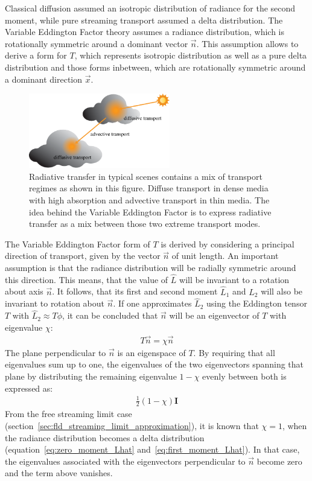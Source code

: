 Classical diffusion assumed an isotropic distribution of radiance for the second moment, while pure streaming transport assumed a delta distribution. The Variable Eddington Factor theory assumes a radiance distribution, which is rotationally symmetric around a dominant vector $\vec{n}$. This assumption allows to derive a form for $T$, which represents isotropic distribution as well as a pure delta distribution and those forms inbetween, which are rotationally symmetric around a dominant direction $\vec{x}$.
\begin{figure}[h]
\centering
\includegraphics[width=0.55\textwidth]{06_fld/figures/fig_transport_regimes_scene.pdf}
\caption{Radiative transfer in typical scenes contains a mix of transport regimes as shown in this figure. Diffuse transport in dense media with high absorption and advective transport in thin media. The idea behind the Variable Eddington Factor is to express radiative transfer as a mix between those two extreme transport modes.}
\label{fig:fld_vef_advection_diffusion2}
\end{figure}

The Variable Eddington Factor form of $T$ is derived by considering a principal direction of transport, given by the vector $\vec{n}$ of unit length. An important assumption is that the radiance distribution will be radially symmetric around this direction. This means, that the value of $\hat{L}$ will be invariant to a rotation about axis $\vec{n}$. It follows, that its first and second moment $\hat{L}_1$ and $\hat{L}_2$ will also be invariant to rotation about $\vec{n}$. If one approximates $\hat{L}_2$ using the Eddington tensor $T$ with $\hat{L}_2\approx T\phi$, it can be concluded that $\vec{n}$ will be an eigenvector of $T$ with eigenvalue $\chi$:
\begin{align*}
T\vec{n} = \chi\vec{n}
\end{align*}
The plane perpendicular to $\vec{n}$ is an eigenspace of $T$. By requiring that all eigenvalues sum up to one, the eigenvalues of the two eigenvectors spanning that plane by distributing the remaining eigenvalue $1-\chi$ evenly between both is expressed as:
\begin{align}
\frac{1}{2}\left(1-\chi\right)\mathbf{I}
\label{eq:iso_var_T_isoterm}
\end{align}
From the free streaming limit case (section~\ref{sec:fld_streaming_limit_approximation}), it is known that $\chi=1$, when the radiance distribution becomes a delta distribution (equation~\ref{eq:zero_moment_Lhat} and~\ref{eq:first_moment_Lhat}). In that case, the eigenvalues associated with the eigenvectors perpendicular to $\vec{n}$ become zero and the term above vanishes.

